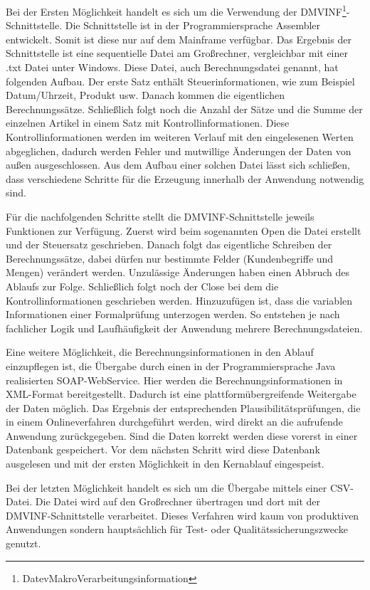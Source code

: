 Bei der Ersten Möglichkeit handelt es sich um die Verwendung der DMVINF\footnote{DatevMakroVerarbeitungsinformation}-Schnittstelle.
Die Schnittstelle ist in der Programmiersprache Assembler entwickelt.
Somit ist diese nur auf dem Mainframe verfügbar.
Das Ergebnis der Schnittstelle ist eine sequentielle Datei am Großrechner, vergleichbar mit einer .txt Datei unter Windows.
Diese Datei, auch Berechnungsdatei genannt, hat folgenden Aufbau.
Der erste Satz enthält Steuerinformationen, wie zum Beispiel Datum/Uhrzeit, Produkt usw.
Danach kommen die eigentlichen Berechnungssätze.
Schließlich folgt noch die Anzahl der Sätze und die Summe der einzelnen Artikel in einem Satz mit Kontrollinformationen.
Diese Kontrollinformationen werden im weiteren Verlauf mit den eingelesenen Werten abgeglichen, dadurch werden Fehler und mutwillige Änderungen der Daten von außen ausgeschlossen.
Aus dem Aufbau einer solchen Datei lässt sich schließen, dass verschiedene Schritte für die Erzeugung innerhalb der Anwendung notwendig sind.

Für die nachfolgenden Schritte stellt die DMVINF-Schnittstelle jeweils Funktionen zur Verfügung.
Zuerst wird beim sogenannten \glqq Open\grqq{} die Datei erstellt und der Steuersatz geschrieben.
Danach folgt das eigentliche Schreiben der Berechnungssätze, dabei dürfen nur bestimmte Felder (Kundenbegriffe und Mengen) verändert werden.
Unzulässige Änderungen haben einen Abbruch des Ablaufs zur Folge.
Schließlich folgt noch der \glqq Close\grqq{} bei dem die Kontrollinformationen geschrieben werden.
Hinzuzufügen ist, dass die variablen Informationen einer Formalprüfung unterzogen werden.
So entstehen je nach fachlicher Logik und Laufhäufigkeit der Anwendung mehrere Berechnungsdateien.

Eine weitere Möglichkeit, die Berechnungsinformationen in den Ablauf einzupflegen ist, die Übergabe durch einen in der Programmiersprache Java realisierten SOAP-WebService.
Hier werden die Berechnungsinformationen in XML-Format bereitgestellt.
Dadurch ist eine plattformübergreifende Weitergabe der Daten möglich.
Das Ergebnis der entsprechenden Plausibilitätsprüfungen, die in einem Onlineverfahren durchgeführt werden, wird direkt an die aufrufende Anwendung zurückgegeben.
Sind die Daten korrekt werden diese vorerst in einer Datenbank gespeichert.
Vor dem nächsten Schritt wird diese Datenbank ausgelesen und mit der ersten Möglichkeit in den Kernablauf eingespeist.

Bei der letzten Möglichkeit handelt es sich um die Übergabe mittels einer CSV-Datei.
Die Datei wird auf den Großrechner übertragen und dort mit der DMVINF-Schnittstelle verarbeitet.
Dieses Verfahren wird kaum von produktiven Anwendungen sondern hauptsächlich für Test- oder Qualitätssicherungszwecke genutzt.

